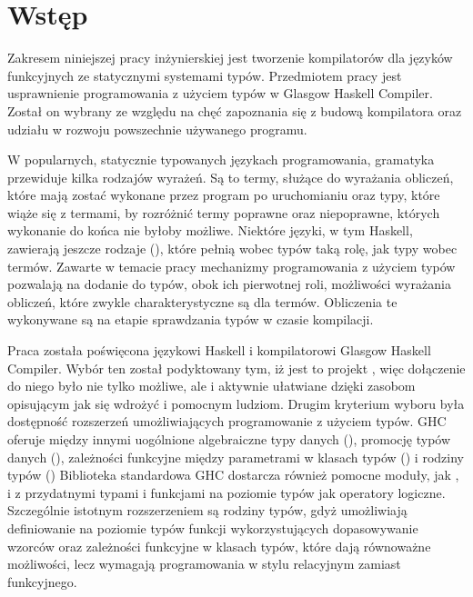 \chapter{Wstęp}\label{chap:wstep}

Zakresem niniejszej pracy inżynierskiej jest
tworzenie kompilatorów dla języków funkcyjnych ze statycznymi systemami typów.
Przedmiotem pracy jest usprawnienie
programowania z użyciem typów w Glasgow Haskell Compiler.
Został on wybrany ze względu na chęć zapoznania się z budową kompilatora oraz
udziału w rozwoju powszechnie używanego programu.

W popularnych, statycznie typowanych językach programowania, gramatyka przewiduje
kilka rodzajów wyrażeń. Są to termy, służące do wyrażania obliczeń, które mają zostać
wykonane przez program po uruchomianiu oraz typy, które wiąże się z termami, by
rozróżnić termy poprawne oraz niepoprawne, których wykonanie do końca nie byłoby możliwe.
Niektóre języki, w tym Haskell, zawierają jeszcze rodzaje (), które pełnią wobec
typów taką rolę, jak typy wobec termów. Zawarte w temacie pracy mechanizmy programowania
z użyciem typów pozwalają na dodanie do typów, obok ich pierwotnej roli, możliwości
wyrażania obliczeń, które zwykle charakterystyczne są dla termów.
Obliczenia te wykonywane są na etapie sprawdzania typów w czasie kompilacji.

Praca została poświęcona językowi Haskell i kompilatorowi Glasgow Haskell
Compiler. Wybór ten został podyktowany tym, iż jest to projekt ,
więc dołączenie do niego było nie tylko możliwe, ale i aktywnie ułatwiane
dzięki zasobom opisującym jak się wdrożyć i pomocnym ludziom.
Drugim kryterium wyboru była dostępność rozszerzeń umożliwiających
programowanie z użyciem typów.
GHC oferuje między innymi uogólnione algebraiczne
typy danych (\cite{ExtPhantomTypes}\cite{ExtGADTs}),
promocję typów danych (\cite{ExtPromotion}),
zależności funkcyjne między parametrami w klasach typów
(\cite{ExtFunDeps})
i rodziny typów (\cite{ExtAssocTyFams}\cite{ExtAssocTypesWithClass}\cite{ExtClosedTyFams})
Biblioteka standardowa GHC dostarcza również pomocne moduły, jak ,
 i  z przydatnymi typami i funkcjami na poziomie
typów jak operatory logiczne.
Szczególnie istotnym rozszerzeniem są rodziny typów, gdyż umożliwiają
definiowanie na poziomie typów funkcji wykorzystujących
dopasowywanie wzorców oraz zależności funkcyjne w klasach typów,
które dają równoważne możliwości,
lecz wymagają programowania w stylu relacyjnym zamiast funkcyjnego.

